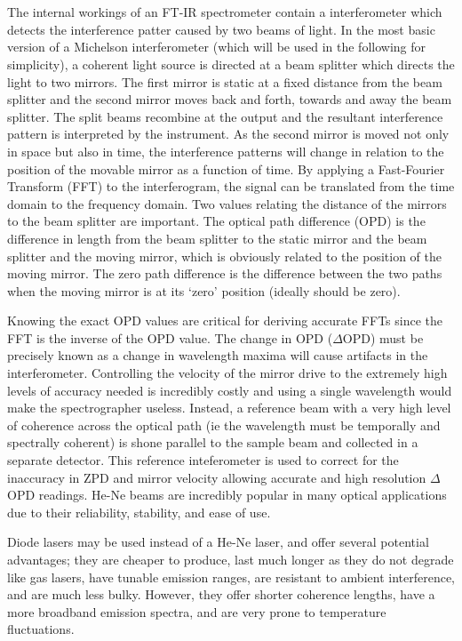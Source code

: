 \documentclass[titlepage]{article}
\begin{document}
\section{}
\setlength{\parindent}{20pt}
\par The internal workings of an FT-IR spectrometer contain a interferometer which detects the interference patter caused by two beams of light. In the most basic version of a Michelson interferometer (which will be used in the following for simplicity), a coherent light source is directed at a beam splitter which directs the light to two mirrors. The first mirror is static at a fixed distance from the beam splitter and the second mirror moves back and forth, towards and away the beam splitter. The split beams recombine at the output and the resultant interference pattern is interpreted by the instrument. As the second mirror is moved not only in space but also in time, the interference patterns will change in relation to the position of the movable mirror as a function of time. By applying a Fast-Fourier Transform (FFT) to the interferogram, the signal can be translated from the time domain to the frequency domain. Two values relating the distance of the mirrors to the beam splitter are important. The optical path difference (OPD) is the difference in length from the beam splitter to the static mirror and the beam splitter and the moving mirror, which is obviously related to the position of the moving mirror. The zero path difference is the difference between the two paths when the moving mirror is at its `zero' position (ideally should be zero). 
\par Knowing the exact OPD values are critical for deriving accurate FFTs since the FFT is the inverse of the OPD value. The change in OPD ($\Delta$OPD) must be precisely known as a change in wavelength maxima will cause artifacts in the interferometer. Controlling the velocity of the mirror drive to the extremely high levels of accuracy needed is incredibly costly and using a single wavelength would make the spectrographer useless. Instead, a reference beam with a very high level of coherence across the optical path (ie the wavelength must be temporally and spectrally coherent) is shone parallel to the sample beam and collected in a separate detector. This reference inteferometer is used to correct for the inaccuracy in ZPD and mirror velocity allowing accurate and high resolution $\Delta$OPD readings. He-Ne beams are incredibly popular in many optical applications due to their reliability, stability, and ease of use.
\par Diode lasers may be used instead of a He-Ne laser, and offer several potential advantages; they are cheaper to produce, last much longer as they do not degrade like gas lasers, have tunable emission ranges, are resistant to ambient interference, and are much less bulky. However, they offer shorter coherence lengths, have a more broadband emission spectra, and are very prone to temperature fluctuations.
\end{document}
